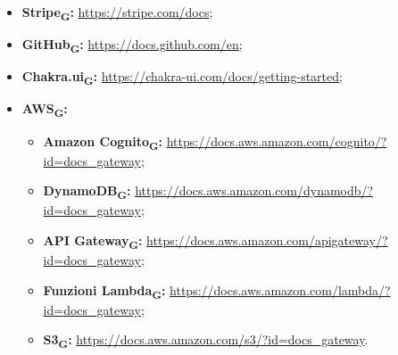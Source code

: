 \begin{itemize}
    \item \textbf{Stripe\textsubscript{\textbf{G}}:} \href{https://stripe.com/docs}{https://stripe.com/docs};
    \item \textbf{GitHub\textsubscript{\textbf{G}}:} \href{https://docs.github.com/en}{https://docs.github.com/en};
    \item \textbf{Chakra.ui\textsubscript{\textbf{G}}:} \href{https://chakra-ui.com/docs/getting-started}{https://chakra-ui.com/docs/getting-started};
    \item \textbf{AWS\textsubscript{\textbf{G}}:}
          \begin{itemize}
              \item \textbf{Amazon Cognito\textsubscript{\textbf{G}}:} \href{https://docs.aws.amazon.com/cognito/?id=docs_gateway}{https://docs.aws.amazon.com/cognito/?id=docs\_gateway};
              \item \textbf{DynamoDB\textsubscript{\textbf{G}}:} \href{https://docs.aws.amazon.com/dynamodb/?id=docs_gateway}{https://docs.aws.amazon.com/dynamodb/?id=docs\_gateway};
              \item \textbf{API Gateway\textsubscript{\textbf{G}}:} \href{https://docs.aws.amazon.com/apigateway/?id=docs_gateway}{https://docs.aws.amazon.com/apigateway/?id=docs\_gateway};
              \item \textbf{Funzioni Lambda\textsubscript{\textbf{G}}:} \href{https://docs.aws.amazon.com/lambda/?id=docs_gateway}{https://docs.aws.amazon.com/lambda/?id=docs\_gateway};
              \item \textbf{S3\textsubscript{\textbf{G}}:} \href{https://docs.aws.amazon.com/s3/?id=docs_gateway}{https://docs.aws.amazon.com/s3/?id=docs\_gateway}.
          \end{itemize}
\end{itemize}